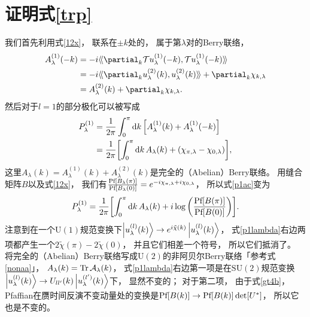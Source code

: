 \section{证明式\eqref{trp}}\label{trp1}
我们首先利用式\eqref{12x}，
联系在$\pm k$处的，
属于第$\lambda$对的Berry联络，
\begin{equation}
\begin{split}
	A^{(1)}_\lambda (-k) &= -i\krin{\partial_k \mathcal T u^{(1)}_\lambda (-k),\mathcal T u_\lambda ^{(1)}(-k)}\\
	& = -i\krin{\partial_k u^{(2)}_\lambda  (k),u_\lambda ^{(2)}(k)}+ \partial_k \chi_{k,\lambda }\\
	&= A^{(2)}_\lambda (k)+ \partial_k \chi_{k,\lambda }.
\end{split}
\end{equation}
然后对于$l=1$的部分极化可以被写成
\begin{equation}\label{p1ac}
\begin{split}
	P^{(1)}_\lambda  &= \frac{1}{2\pi}\int_0^\pi \dd{k} \bqty{A^{(1)}_\lambda (k)+A^{(1)}_\lambda (-k)}\\
	&= \frac{1}{2\pi}\bqty{\int_0^\pi \dd{k} A_\lambda (k)+(\chi_{\pi,\lambda }-\chi_{0,\lambda })},
\end{split}
\end{equation}
这里$A_\lambda (k)=A_\lambda ^{(1)}(k)+A_\lambda ^{(2)}(k)$是完全的（Abelian）Berry联络。
用缝合矩阵$B$以及式\eqref{12x}，
我们有$\frac{\textnormal{Pf}[B_\lambda (\pi)]}{\textnormal{Pf}[B_\lambda (0)]}=e^{-i \chi_{\pi,\lambda }+i \chi_{0,\lambda }}$，
所以式\eqref{p1ac}变为
\begin{equation}\label{p1lambda}
	P^{(1)}_\lambda  = \frac{1}{2\pi}\bqty{\int_0^\pi \dd{k} A_\lambda (k)+i \log\pqty{\frac{\pf[B(\pi)]}{\pf[B(0)]}}}.
\end{equation}
注意到在一个$\mathrm{U}(1)$规范变换下$\ket{u_\lambda ^{(l)}(k)}\rightarrow e^{i\tilde \chi(k)}\ket{u_\lambda ^{(l)}(k)}$，
式\eqref{p1lambda}右边两项都产生一个$2\tilde \chi(\pi)-2\tilde \chi(0)$，
并且它们相差一个符号，
所以它们抵消了。
将完全的（Abelian）Berry联络写成$\mathrm{U}(2)$的非阿贝尔Berry联络「参考式\eqref{nonaa}」，
$A_\lambda (k)=\Tr \mathcal A_\lambda (k)$，
式\eqref{p1lambda}右边第一项是在$\mathrm{SU}(2)$规范变换$\ket{u_\lambda ^{(l)}(k)}\rightarrow U_{ll'}(k)\ket{u_\lambda ^{(l')}(k)}$下，
显然不变的；
对于第二项，
由于式\eqref{gt4b}，
Pfaffian在赝时间反演不变动量处的变换是$\textnormal{Pf}[B(k)]\rightarrow \textnormal{Pf}[B(k)]\det[U^*]$，
所以它也是不变的。
